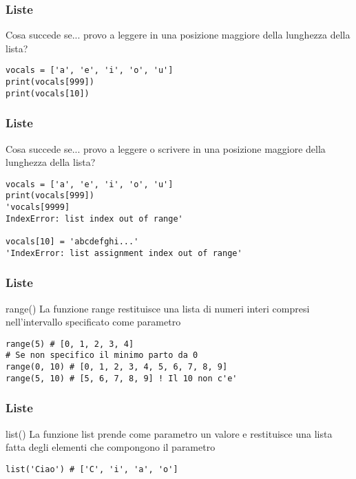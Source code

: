 \begin{frame}[fragile]
\frametitle{Liste}
    \begin{block}{Cosa succede se...}
provo a leggere in una posizione maggiore della lunghezza della lista?
    \end{block}
    
    \begin{lstlisting}
vocals = ['a', 'e', 'i', 'o', 'u']
print(vocals[999])
print(vocals[10])
    \end{lstlisting}

\end{frame}

\begin{frame}[fragile]
\frametitle{Liste}
    \begin{block}{Cosa succede se...}
provo a leggere o scrivere in una posizione maggiore della lunghezza della lista?
    \end{block}
    
    \begin{lstlisting}
vocals = ['a', 'e', 'i', 'o', 'u']
print(vocals[999])
'vocals[9999]
IndexError: list index out of range'

vocals[10] = 'abcdefghi...'
'IndexError: list assignment index out of range'
    \end{lstlisting}
\end{frame}

\begin{frame}[fragile]
\frametitle{Liste}
    \begin{block}{range()}
    La funzione range restituisce una lista di numeri interi compresi nell'intervallo specificato come parametro
    \end{block}
    
    \begin{lstlisting}
range(5) # [0, 1, 2, 3, 4]
# Se non specifico il minimo parto da 0    
range(0, 10) # [0, 1, 2, 3, 4, 5, 6, 7, 8, 9]
range(5, 10) # [5, 6, 7, 8, 9] ! Il 10 non c'e'
    \end{lstlisting}
\end{frame}

\begin{frame}[fragile]
\frametitle{Liste}
    \begin{block}{list()}
    La funzione list prende come parametro un valore e restituisce una lista fatta degli elementi che compongono il parametro
    \end{block}
    
    \begin{lstlisting}
list('Ciao') # ['C', 'i', 'a', 'o']
    \end{lstlisting}
\end{frame}

